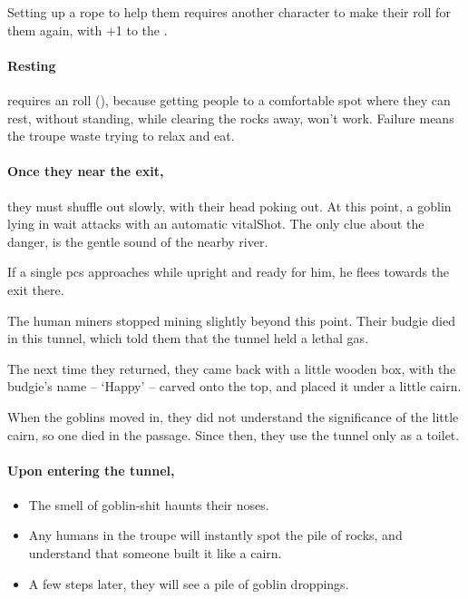 \begin{multicols}{2}
Setting up a rope to help them requires another character to make their roll for them again, with +1 to the .


\paragraph{Resting}
requires an  roll (\tn[10]), because getting people to a comfortable spot where they can rest, without standing, while clearing the rocks away, won't work.
Failure means the troupe waste  trying to relax and eat.

\paragraph{Once they near the exit,}
they must shuffle out slowly, with their head poking out.
At this point, a goblin lying in wait attacks with an automatic \gls{vitalShot}.
The only clue about the danger, is the gentle sound of the nearby river.

If a single \glspl{pc} approaches while upright and ready for him, he flees towards the exit there.


\begin{exampletext}
  The human miners stopped mining slightly beyond this point.
  Their budgie died in this tunnel, which told them that the tunnel held a lethal gas.

  The next time they returned, they came back with a little wooden box, with the budgie's name -- `Happy' -- carved onto the top, and placed it under a little cairn.

  When the goblins moved in, they did not understand the significance of the little cairn, so one died in the passage.
  Since then, they use the tunnel only as a toilet.
\end{exampletext}

\paragraph{Upon entering the tunnel,}

\begin{itemize}
  \item
  The smell of goblin-shit haunts their noses.
  \item
  Any humans in the troupe will instantly spot the pile of rocks, and understand that someone built it like a cairn.
  \item
  A few \glspl{step} later, they will see a pile of goblin droppings.
\end{itemize}


\end{multicols}

